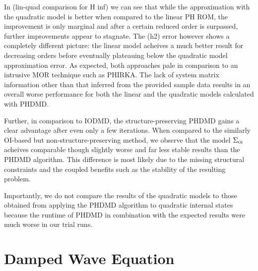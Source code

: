 


In (lin-quad comparison for H inf) we can see that while the approximation with the quadratic model is better when compared to the linear \ac{PH} \ac{ROM}, the improvement is only marginal and after a certain reduced order is surpassed, further improvements appear to stagnate.
The (h2) error however shows a completely different picture: the linear model acheives a much better result for decreasing orders before eventually plateauing below the quadratic model approximation error.
As expected, both approaches pale in comparison to an intrusive \ac{MOR} technique such as \ac{PHIRKA}.
The lack of system matrix information other than that inferred from the provided sample data results in an overall worse performance for both the linear and the quadratic models calculated with \ac{PHDMD}.

Further, in comparison to \ac{IODMD}, the structure-preserving \ac{PHDMD} gains a clear advantage after even only a few iterations.
When compared to the similarly \ac{OI}-based but non-structure-preserving method, we observe that the model $\Sigma_{\textnormal{\scshape oi}}$ acheives comparable though slightly worse and far less stable results than the \ac{PHDMD} algorithm.
This difference is most likely due to the missing structural constraints and the coupled benefits such as the stability of the resulting problem.


Importantly, we do not compare the results of the quadratic models to those obtained from applying the \ac{PHDMD} algorithm to quadratic internal states because the runtime of \ac{PHDMD} in combination with the expected results were much worse in our trial runs.

\section{Damped Wave Equation}\label{sec:damped-wave-equation}

